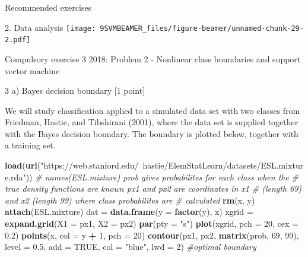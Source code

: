 \documentclass[ignorenonframetext,]{beamer}
\newenvironment{Shaded}{\begin{snugshade}}{\end{snugshade}}
\newcommand{\KeywordTok}[1]{\textcolor[rgb]{0.13,0.29,0.53}{\textbf{#1}}}
\newcommand{\DataTypeTok}[1]{\textcolor[rgb]{0.13,0.29,0.53}{#1}}
\newcommand{\DecValTok}[1]{\textcolor[rgb]{0.00,0.00,0.81}{#1}}
\newcommand{\FloatTok}[1]{\textcolor[rgb]{0.00,0.00,0.81}{#1}}
\newcommand{\StringTok}[1]{\textcolor[rgb]{0.31,0.60,0.02}{#1}}
\newcommand{\CommentTok}[1]{\textcolor[rgb]{0.56,0.35,0.01}{\textit{#1}}}
\newcommand{\OtherTok}[1]{\textcolor[rgb]{0.56,0.35,0.01}{#1}}
\newcommand{\OperatorTok}[1]{\textcolor[rgb]{0.81,0.36,0.00}{\textbf{#1}}}
\newcommand{\NormalTok}[1]{#1}
\begin{document}
\begin{frame}[fragile]{Recommended exercises}
\begin{block}{2. Data analysis}
\texttt{[image: 9SVMBEAMER\_files/figure-beamer/unnamed-chunk-29-2.pdf]}

\end{block}

\begin{block}{Compulsory exercise 3 2018: Problem 2 - Nonlinear class
boundaries and support vector machine}

\end{block}

\begin{block}{3 a) Bayes decision boundary {[}1 point{]}}

We will study classification applied to a simulated data set with two
classes from Friedman, Hastie, and Tibshirani (2001), where the data set
is supplied together with the Bayes decision boundary. The boundary is
plotted below, together with a training set.

\begin{Shaded}
\begin{Highlighting}[]
\KeywordTok{load}\NormalTok{(}\KeywordTok{url}\NormalTok{(}\StringTok{"https://web.stanford.edu/~hastie/ElemStatLearn/datasets/ESL.mixture.rda"}\NormalTok{))}
\CommentTok{# names(ESL.mixture) prob gives probabilites for each class when the}
\CommentTok{# true density functions are known px1 and px2 are coordinates in x1}
\CommentTok{# (length 69) and x2 (length 99) where class probabilites are}
\CommentTok{# calculated}
\KeywordTok{rm}\NormalTok{(x, y)}
\KeywordTok{attach}\NormalTok{(ESL.mixture)}
\NormalTok{dat =}\StringTok{ }\KeywordTok{data.frame}\NormalTok{(}\DataTypeTok{y =} \KeywordTok{factor}\NormalTok{(y), x)}
\NormalTok{xgrid =}\StringTok{ }\KeywordTok{expand.grid}\NormalTok{(}\DataTypeTok{X1 =}\NormalTok{ px1, }\DataTypeTok{X2 =}\NormalTok{ px2)}
\KeywordTok{par}\NormalTok{(}\DataTypeTok{pty =} \StringTok{"s"}\NormalTok{)}
\KeywordTok{plot}\NormalTok{(xgrid, }\DataTypeTok{pch =} \DecValTok{20}\NormalTok{, }\DataTypeTok{cex =} \FloatTok{0.2}\NormalTok{)}
\KeywordTok{points}\NormalTok{(x, }\DataTypeTok{col =}\NormalTok{ y }\OperatorTok{+}\StringTok{ }\DecValTok{1}\NormalTok{, }\DataTypeTok{pch =} \DecValTok{20}\NormalTok{)}
\KeywordTok{contour}\NormalTok{(px1, px2, }\KeywordTok{matrix}\NormalTok{(prob, }\DecValTok{69}\NormalTok{, }\DecValTok{99}\NormalTok{), }\DataTypeTok{level =} \FloatTok{0.5}\NormalTok{, }\DataTypeTok{add =} \OtherTok{TRUE}\NormalTok{, }\DataTypeTok{col =} \StringTok{"blue"}\NormalTok{, }
    \DataTypeTok{lwd =} \DecValTok{2}\NormalTok{)  }\CommentTok{#optimal boundary}
\end{Highlighting}
\end{Shaded}


\end{block}
\end{frame}
\end{document}
